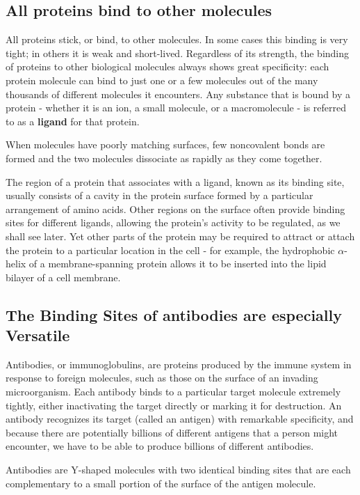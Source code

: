 \subsection{All proteins bind to other molecules}

All proteins stick, or bind, to other molecules. In some cases this binding is
very tight; in others it is weak and short-lived.
Regardless of its strength, the binding
of proteins to other biological molecules always shows great specificity:
each protein molecule can bind to just one or a few molecules out of
the many thousands of different molecules it encounters. Any substance
that is bound by a protein - whether it is an ion, a small molecule, or a
macromolecule - is referred to as a \textbf{ligand} for that protein.

When molecules have poorly matching surfaces, few noncovalent bonds
are formed and the two molecules dissociate as rapidly as they come
together.

The region of a protein that associates with a ligand, known as its binding site,
usually consists of a cavity in the protein surface formed by a
particular arrangement of amino acids. Other regions on the surface often provide
binding sites for different ligands, allowing the protein’s
activity to be regulated, as we shall see later. Yet other parts of the protein
may be required to attract or attach the protein to a particular location in
the cell - for example, the hydrophobic $\alpha$-helix of a membrane-spanning
protein allows it to be inserted into the lipid bilayer of a cell membrane.

\subsection{The Binding Sites of antibodies are especially Versatile}

Antibodies, or immunoglobulins, are proteins produced by the immune
system in response to foreign molecules, such as those on the surface
of an invading microorganism. Each antibody binds to a particular target
molecule extremely tightly, either inactivating the target directly or
marking it for destruction. An antibody recognizes its target (called an
antigen) with remarkable specificity, and because there are potentially
billions of different antigens that a person might encounter, we have to
be able to produce billions of different antibodies.

Antibodies are Y-shaped molecules with two identical binding sites that
are each complementary to a small portion of the surface of the antigen
molecule.

